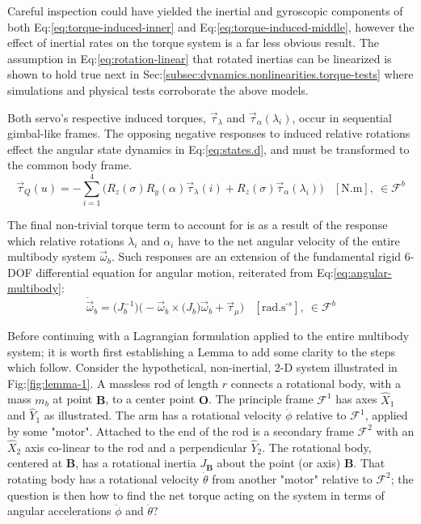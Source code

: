 Careful inspection could have yielded the inertial and gyroscopic components of both Eq:\ref{eq:torque-induced-inner} and Eq:\ref{eq:torque-induced-middle}, however the effect of inertial rates on the torque system is a far less obvious result. The assumption in Eq:\ref{eq:rotation-linear} that rotated inertias can be linearized is shown to hold true next in Sec:\ref{subsec:dynamics.nonlinearities.torque-tests} where simulations and physical tests corroborate the above models.
\par
Both servo's respective induced torques, $\vec{\tau}_\lambda$ and $\vec{\tau}_\alpha(\lambda_i)$, occur in sequential gimbal-like frames. The opposing negative responses to induced relative rotations effect the angular state dynamics in Eq:\ref{eq:states.d}, and must be transformed to the common body frame.
\begin{equation}\label{eq:torque-response}
\vec{\tau}_Q(u)=-\sum_{i=1}^4 \Big(R_z(\sigma)R_y(\alpha)\vec{\tau}_{\lambda}(i)+R_z(\sigma)\vec{\tau}_{\alpha}(\lambda_i)\Big)~~~~[\text{N.m}],~\in\mathcal{F}^b
\end{equation}
\par
The final non-trivial torque term to account for is as a result of the response which relative rotations $\lambda_i$ and $\alpha_i$ have to the net angular velocity of the entire multibody system $\vec{\omega}_b$. Such responses are an extension of the fundamental rigid 6-DOF differential equation for angular motion, reiterated from Eq:\ref{eq:angular-multibody}:
\begin{equation}
\dot{\vec{\omega}}_b=\big(J_b^{-1}\big)\Big(-\vec{\omega}_b\times\big(J_b\big)\vec{\omega}_b+\vec{\tau}_{\mu}\Big)~~~~[\text{rad.s}^{\text{-}s}],~\in\mathcal{F}^b
\end{equation}
\par
Before continuing with a Lagrangian formulation applied to the entire multibody system; it is worth first establishing a Lemma to add some clarity to the steps which follow. Consider the hypothetical, non-inertial, 2-D system illustrated in Fig:\ref{fig:lemma-1}. A massless rod of length $r$ connects a rotational body, with a mass $m_b$ at point $\mathbf{B}$, to a center point $\mathbf{O}$. The principle frame $\mathcal{F}^{1}$ has axes $\hat{X}_1$ and $\hat{Y}_1$ as illustrated. The arm has a rotational velocity $\dot{\phi}$ relative to $\mathcal{F}^{1}$, applied by some "motor". Attached to the end of the rod is a secondary frame $\mathcal{F}^2$ with an $\hat{X}_2$ axis co-linear to the rod and a perpendicular $\hat{Y}_2$. The rotational body, centered at $\mathbf{B}$, has a rotational inertia $J_\mathbf{B}$ about the point (or axis) $\mathbf{B}$. That rotating body has a rotational velocity $\dot{\theta}$ from another "motor" relative to $\mathcal{F}^2$; the question is then how to find the net torque acting on the system in terms of angular accelerations $\ddot{\phi}$ and $\ddot{\theta}$?
